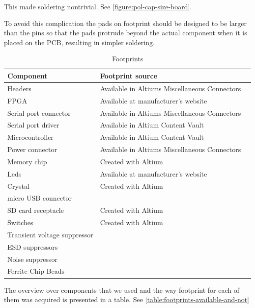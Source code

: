 This made soldering nontrivial.
See \vref{figure:pol-cap-size-board}.

To avoid this complication the pads on footprint should be designed to be larger than the pins so that the pads protrude beyond the actual component when it is placed on the PCB, resulting in simpler soldering.

 \begin{table}[H]
 \begin{center}
 \begin{tabular}{| l | l | l |}
 \hline
 Component & Footprint source\\
 \hline
 Headers & Available in Altiums Miscellaneous Connectors \\
 FPGA & Available at manufacturer's website \\
 Serial port connector & Available in Altiums Miscellaneous Connectors \\
 Serial port driver & Available in Altium Content Vault \\
 Microcontroller & Available in Altium Content Vault \\
 Power connector &  Available in Altiums Miscellaneous Connectors\\
 Memory chip & Created with Altium \\
 Leds &  Available at manufacturer's website\\
 Crystal &  Created with Altium \\
 micro USB connector &  \\
 SD card receptacle & Created with Altium \\
 Switches & Created with Altium \\
 Transient voltage suppressor &  \\
 ESD suppressors & \\
 Noise suppressor &  \\
 Ferrite Chip Beads &  \\
 \hline
 \end{tabular}
 \caption{Footprints}
 \label{table:footprints-available-and-not}
 \end{center}
 \end{table}


The overview over components that we used and the way footprint for each of them was acquired is presented in a table. See \vref{table:footprints-available-and-not}